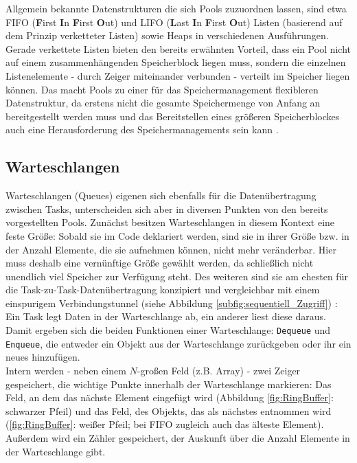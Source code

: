 \documentclass{llncs}
\begin{document}
Allgemein bekannte Datenstrukturen die sich Pools zuzuordnen lassen, sind etwa FIFO (\textbf{F}irst \textbf{I}n \textbf{F}irst \textbf{O}ut) und LIFO (\textbf{L}ast \textbf{I}n \textbf{F}irst \textbf{O}ut) Listen (basierend auf dem Prinzip verketteter Listen) sowie Heaps in verschiedenen Ausführungen. Gerade verkettete Listen bieten den bereits erwähnten Vorteil, dass ein Pool nicht auf einem zusammenhängenden Speicherblock liegen muss, sondern die einzelnen Listenelemente - durch Zeiger miteinander verbunden - verteilt im Speicher liegen können. Das macht Pools zu einer für das Speichermanagement flexibleren Datenstruktur, da erstens nicht die gesamte Speichermenge von Anfang an bereitgestellt werden muss und das Bereitstellen eines größeren Speicherblockes auch eine Herausforderung des Speichermanagements sein kann \autocite[vgl.][96]{Cooling2017}.

\subsection{Warteschlangen}
\label{subsec:Warteschlange}
Warteschlangen (Queues) eigenen sich ebenfalls für die Datenübertragung zwischen Tasks, unterscheiden sich aber in diversen Punkten von den bereits vorgestellten Pools. Zunächst besitzen Warteschlangen in diesem Kontext eine feste Größe: Sobald sie im Code deklariert werden, sind sie in ihrer Größe bzw. in der Anzahl Elemente, die sie aufnehmen können, nicht mehr veränderbar. Hier muss deshalb eine vernünftige Größe gewählt werden, da schließlich nicht unendlich viel Speicher zur Verfügung steht. Des weiteren sind sie am ehesten für die Task-zu-Task-Datenübertragung konzipiert und vergleichbar mit einem einspurigem Verbindungstunnel (siehe Abbildung \ref{subfig:sequentiell_Zugriff}) \autocite[vgl.][96]{Cooling2017}: Ein Task legt Daten in der Warteschlange ab, ein anderer liest diese daraus. Damit ergeben sich die beiden Funktionen einer Warteschlange: \texttt{Dequeue} und \texttt{Enqueue}, die entweder ein Objekt aus der Warteschlange zurückgeben oder ihr ein neues hinzufügen.\\

Intern werden - neben einem $N$-großen Feld (z.B. Array) - zwei Zeiger gespeichert, die wichtige Punkte innerhalb der Warteschlange markieren: Das Feld, an dem das nächste Element eingefügt wird (Abbildung \ref{fig:RingBuffer}: schwarzer Pfeil) und das Feld, des Objekts, das als nächstes entnommen wird (\ref{fig:RingBuffer}: weißer Pfeil; bei FIFO zugleich auch das älteste Element). Außerdem wird ein Zähler gespeichert, der Auskunft über die Anzahl Elemente in der Warteschlange gibt.
\end{document}
